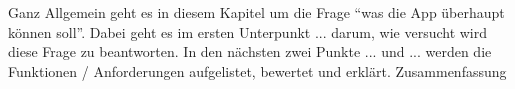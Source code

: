 Ganz Allgemein geht es in diesem Kapitel um die Frage “was die App überhaupt können soll”. \newline
Dabei geht es im ersten Unterpunkt ... darum, wie versucht wird diese Frage zu beantworten.
In den nächsten zwei Punkte ... und ... werden die Funktionen / Anforderungen aufgelistet, bewertet und erklärt. \newline
\myTodo Zusammenfassung